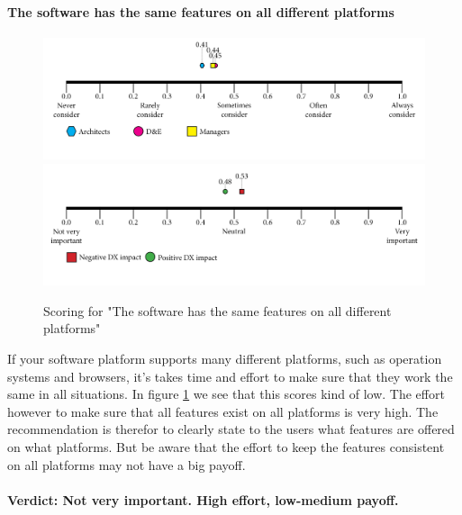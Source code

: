     \paragraph{The software has the same features on all different platforms}
    \begin{figure}[H]
        \centering
        \includegraphics[width=\linewidth]{scorelines/aspect11.png}
        \includegraphics[width=\linewidth]{dxscorelines/dxaspect11.png}
        \caption{Scoring for "The software has the same features on all different platforms"}
        \label{fig:aspect11}
    \end{figure}
    If your software platform supports many different platforms, such as operation systems and browsers, it's takes time and effort to make sure that they work the same in all situations. In figure \ref{fig:aspect11} we see that this scores kind of low. The effort however to make sure that all features exist on all platforms is very high. The recommendation is therefor to clearly state to the users what features are offered on what platforms. But be aware that the effort to keep the features consistent on all platforms may not have a big payoff. \\ \\
    \textbf{Verdict: Not very important. High effort, low-medium payoff.}
    
